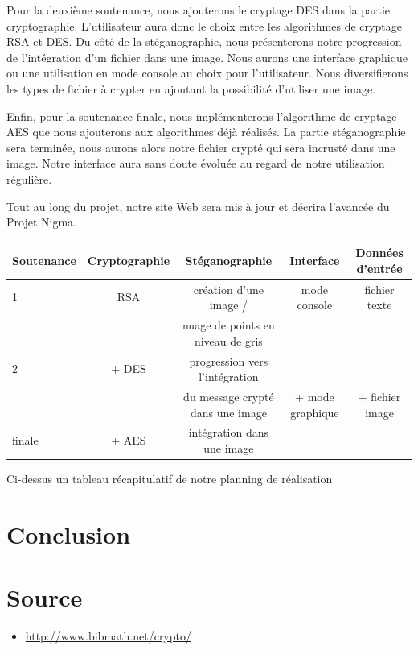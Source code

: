 \documentclass[a4paper,12pt]{article}
\begin{document}
Pour la deuxième soutenance, nous ajouterons le cryptage DES dans la partie cryptographie. L'utilisateur aura donc le choix entre les algorithmes de cryptage RSA et DES. Du côté de la stéganographie, nous présenterons notre progression de l'intégration d'un fichier dans une image. Nous aurons une interface graphique ou une utilisation en mode console au choix pour l'utilisateur. Nous diversifierons les types de fichier à crypter en ajoutant la possibilité d'utiliser une image.

Enfin, pour la soutenance finale, nous implémenterons l'algorithme de cryptage AES que nous ajouterons aux algorithmes déjà réalisés. La partie stéganographie sera terminée, nous aurons alors notre fichier crypté qui sera incrusté dans une image. Notre interface aura sans doute évoluée au regard de notre utilisation régulière.

Tout au long du projet, notre site Web sera mis à jour et décrira l'avancée du Projet Nigma.

\bigskip

\begin{landscape}
  \begin{tabular}{|l|c|c|c|c|}
    \hline
    Soutenance & Cryptographie & Stéganographie                    & Interface        & Données d'entrée \\ \hline \hline
    1          & RSA           & création d'une image /            & mode console     & fichier texte    \\
    &               & nuage de points en niveau de gris &                  &                  \\ \hline
    2          & + DES         & progression vers l'intégration    &                  &                  \\
    &               & du message crypté dans une image  & + mode graphique & + fichier image  \\ \hline
    finale     & + AES         & intégration dans une image        &                  &                  \\ \hline
  \end{tabular}
  \begin{center}
    Ci-dessus un tableau récapitulatif de notre planning de réalisation
  \end{center}
\end{landscape}
\newpage

\part{Conclusion}

\newpage

\part*{Source}

\begin{itemize}
\item \href{http://www.bibmath.net/crypto/}{http://www.bibmath.net/crypto/}
\end{itemize}
\end{document}

